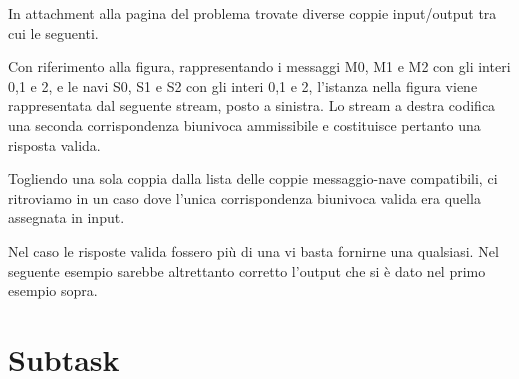 In attachment alla pagina del problema trovate diverse coppie input/output tra cui le seguenti.

Con riferimento alla figura, rappresentando i messaggi M0, M1 e M2 con gli interi 0,1 e 2, e  le navi S0, S1 e S2 con gli interi 0,1 e 2, l'istanza nella figura viene rappresentata dal seguente stream, posto a sinistra.
  Lo stream a destra codifica una seconda corrispondenza biunivoca ammissibile e costituisce pertanto una risposta valida.

\vspace{0.5cm}

Togliendo una sola coppia dalla lista delle coppie messaggio-nave compatibili, ci ritroviamo in un caso dove l'unica corrispondenza biunivoca valida era quella assegnata in input.

\vspace{0.5cm}

\newpage
 Nel caso le risposte valida fossero più di una vi basta fornirne una qualsiasi. Nel seguente esempio sarebbe altrettanto corretto l'output che si è dato nel primo esempio sopra. 

\vspace{0.5cm}


\section*{Subtask}

